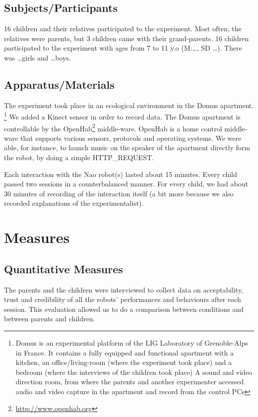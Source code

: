 \documentclass[a4paper,twocolumn]{svjour3}
\begin{document}
\subsection{Subjects/Participants}
16 children and their relatives participated to the experiment. 
Most often, the relatives were parents, but 3 children came with their grand-parents.
16 children participated to the experiment with ages from 7 to 11 y.o (M:\dots, SD \dots).
There was \dots girls and \dots boys. 

\subsection{Apparatus/Materials}
The experiment took place in an ecological environment in the Domus apartment.
\footnote{Domus is an experimental platform of the LIG Laboratory of Grenoble-Alps in France.
	It contains a fully equipped and functional apartment with a kitchen, an office/living-room (where the experiment took place) and  a bedroom (where the interviews of the children took place)
	A sound and video direction room, from where the parents and another experimenter accessed audio and video capture in the apartment and record from the control PCs}
We added a Kinect sensor in order to record data. 
The Domus apartment is controllable by the OpenHab\footnote{\url{http://www.openhab.org}} middle-ware. 
OpenHab is a home control middle-ware that supports various sensors, protocols and operating systems. 
We were able, for instance, to launch music on the speaker of the apartment directly form the robot, by doing a simple HTTP\_REQUEST. 

Each interaction with the Nao robot(s) lasted about 15 minutes. 
Every child passed two sessions in a counterbalanced manner. 
For every child, we had about 30 minutes of recording of the interaction itself (a bit more because we also recorded explanations of the experimentalist). 
 


\section{Measures}
\subsection{Quantitative Measures}

The parents and the children were interviewed to collect data on acceptability, trust and  credibility of all the robots' performances and behaviours after each session. 
This evaluation allowed us to do a comparison between conditions and between parents and children.
\end{document}
